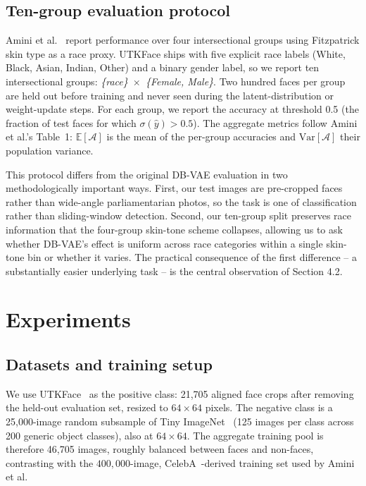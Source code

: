 \documentclass[10pt,twocolumn]{article}
\begin{document}
\subsection{Ten-group evaluation protocol}
\label{sec:eval}

Amini et al.~\cite{amini2019dbvae} report performance over four
intersectional groups using Fitzpatrick skin type as a race proxy. UTKFace
ships with five explicit race labels (White, Black, Asian, Indian, Other)
and a binary gender label, so we report ten intersectional groups:
\textit{\{race\}~$\times$~\{Female, Male\}}. Two hundred faces per group
are held out before training and never seen during the latent-distribution
or weight-update steps. For each group, we report the accuracy at threshold
0.5 (the fraction of test faces for which $\sigma(\hat{y}) > 0.5$). The
aggregate metrics follow Amini et al.'s Table~1: $\mathbb{E}[\mathcal{A}]$
is the mean of the per-group accuracies and $\mathrm{Var}[\mathcal{A}]$
their population variance.

This protocol differs from the original DB-VAE evaluation in two
methodologically important ways. First, our test images are pre-cropped
faces rather than wide-angle parliamentarian photos, so the task is one of
classification rather than sliding-window detection. Second, our ten-group
split preserves race information that the four-group skin-tone scheme
collapses, allowing us to ask whether DB-VAE's effect is uniform across
race categories within a single skin-tone bin or whether it varies. The
practical consequence of the first difference -- a substantially easier
underlying task -- is the central observation of Section 4.2.

\section{Experiments}

\subsection{Datasets and training setup}

We use UTKFace~\cite{zhang2017utkface} as the positive class: 21{,}705 aligned face crops after
removing the held-out evaluation set, resized to $64 \times 64$ pixels.
The negative class is a 25{,}000-image random subsample of Tiny ImageNet~\cite{le2015tinyimagenet}
(125 images per class across 200 generic object classes), also at
$64 \times 64$. The aggregate training pool is therefore 46{,}705 images,
roughly balanced between faces and non-faces, contrasting with the
    $400{,}000$-image, CelebA~\cite{liu2015celeba}-derived training set used by Amini et al.
\end{document}
